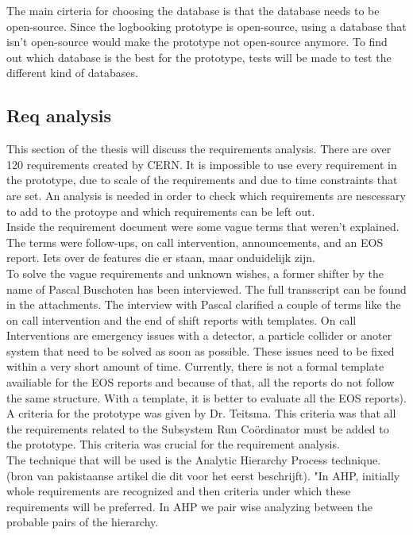 \documentclass[paper=a4, fontsize=11pt,twoside]{scrartcl}	%
\begin{document}
The main cirteria for choosing the database is that the database needs to be open-source. Since the logbooking prototype is open-source, using a database that isn't open-source would make the prototype not open-source anymore. To find out which database is the best for the prototype, tests will be made to test the different kind of databases. \\


\subsection{Req analysis}
This section of the thesis will discuss the requirements analysis. There are over 120 requirements created by CERN. It is impossible to use every requirement in the prototype, due to scale of the requirements and due to time constraints that are set. An analysis is needed in order to check which requirements are nescessary to add to the protoype and which requirements can be left out.  \\
Inside the requirement document were some vague terms that weren't explained. The terms were follow-ups, on call intervention, announcements, and an EOS report. Iets over de features die er staan, maar onduidelijk zijn. \\
To solve the vague requirements and unknown wishes, a former shifter by the name of Pascal Buschoten has been interviewed. The full transscript can be found in the attachments. The interview with Pascal clarified a couple of terms like the on call intervention and the end of shift reports with templates. On call Interventions are emergency issues with a detector, a particle collider or anoter system that need to be solved as soon as possible. These issues need to be fixed within a very short amount of time. Currently, there is not a formal template availiable for the EOS reports  and because of that, all the reports do not follow the same structure. With a template, it is better to evaluate all the EOS reports).\\
A criteria for the prototype was given by Dr. Teitsma. This criteria was that all the requirements related to the Subsystem Run Coördinator must be added to the prototype. This criteria was crucial for the requirement analysis. \\
The technique that will be used is the Analytic Hierarchy Process technique.(bron van pakistaanse artikel die dit voor het eerst beschrijft). "In AHP, initially whole requirements are recognized and then criteria under which these requirements will be preferred. In AHP we pair wise analyzing  between  the  probable  pairs  of  the  hierarchy. 
\end{document}
